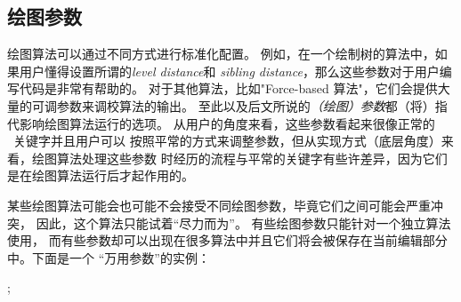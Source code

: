\subsection{绘图参数}
绘图算法可以通过不同方式进行标准化配置。
例如，在一个绘制树的算法中，如果用户懂得设置所谓的\emph{level distance}和
\emph{sibling distance}，那么这些参数对于用户编写代码是非常有帮助的。
对于其他算法，比如"Force-based 算法"，它们会提供大量的可调参数来调校算法的输出。
至此以及后文所说的\emph{（绘图）参数}都（将）指代影响绘图算法运行的选项。
从用户的角度来看，这些参数看起来很像正常的 \tikzname\ 关键字并且用户可以
按照平常的方式来调整参数，但从实现方式（底层角度）来看，绘图算法处理这些参数
时经历的流程与平常的关键字有些许差异，因为它们是在绘图算法运行后才起作用的。

某些绘图算法可能会也可能不会接受不同绘图参数，毕竟它们之间可能会严重冲突，
因此，这个算法只能试着“尽力而为”。 有些绘图参数只能针对一个独立算法使用，
而有些参数却可以出现在很多算法中并且它们将会被保存在当前编辑部分中。下面是一个
“万用参数”的实例：

\begin{codeexample}[]
\tikz {};  
\end{codeexample}





